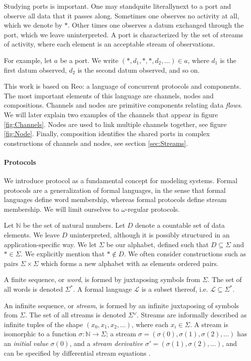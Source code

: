 Studying ports is important.
One may stand\textemdash quite literally\textemdash next to a port and observe all data that it passes along.
Sometimes one observes no activity at all, which we denote by $*$.
Other times one observes a datum exchanged through the port, which we leave uninterpreted.
A port is characterized by the set of streams of activity,
where each element is an acceptable stream of observations.

For example, let $a$ be a port. We write $(*,d_{1},*,*,d_{2},\ldots)\in a$, where $d_{1}$ is the first datum observed, $d_{2}$ is the second datum observed, and so on.

\medskip

This work is based on Reo: a language of concurrent protocols and components.
The most important elements of this language are channels, nodes and compositions.
Channels and nodes are primitive components relating data \emph{flows}.
We will later explain two examples of the channels that appear in figure \ref{fig:Channels}.
Nodes are used to link multiple channels together, see figure \ref{fig:Node}.
Finally, composition identifies the shared ports in complex constructions of channels and nodes,
see section \ref{sec:Streams}.

\paragraph{Protocols}

We introduce protocol as a fundamental concept for modeling systems.
Formal protocols are a generalization of formal languages,
in the sense that formal languages define word membership,
whereas formal protocols define stream membership.
We will limit ourselves to $\omega$-regular protocols.

Let $\mathbb{N}$ be the set of natural numbers.
Let $D$ denote a countable set of data elements.
We leave $D$ uninterpreted, although it is possibly structured in an application-specific way.
We let $\Sigma$ be our alphabet, defined such that $D\subseteq\Sigma$ and $*\in\Sigma$.
We explicitly mention that $*\not\in D$. We often consider constructions
such as pairs $\Sigma\times\Sigma$ which forms a new alphabet with as elements ordered pairs.

A finite sequence, or \emph{word}, is formed by juxtaposing symbols from $\Sigma$.
The set of all words is denoted $\Sigma^{*}$.
A formal language $\mathcal{L}$ is a subset thereof,
i.e. $\mathcal{L}\subseteq\Sigma^{*}$.

An infinite sequence, or \emph{stream}, is formed by an infinite juxtaposing of symbols from $\Sigma$.
The set of all streams is denoted $\Sigma^{\omega}$.
Streams are informally described as infinite tuples
of the shape $(x_{0},x_{1},x_{2},\ldots)$, where each $x_i \in \Sigma$.
A stream is isomorphic to a function $\sigma:\mathbb{N}\to\Sigma$;
a stream $\sigma = (\sigma(0),\sigma(1),\sigma(2),\ldots)$ has
an \emph{initial value} $\sigma(0)$,
and a \emph{stream derivative} $\sigma' = (\sigma(1),\sigma(2),\ldots)$,
and can be specified by differential stream equations \cite{?}.

